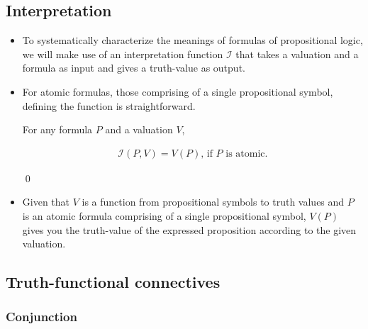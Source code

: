 \documentclass[11pt]{article}
\begin{document}
\subsection{Interpretation}

\begin{itemize}

\item To systematically characterize the meanings of formulas of propositional
logic, we will make use of an interpretation function $\mathcal{I}$ that takes a valuation and
a formula as input and gives a truth-value as output.

\item For atomic formulas, those comprising of a single propositional symbol,
defining the function is straightforward. 


\begin{udefinition}\label{isimple}

For any formula $P$ and a
valuation $V$,

\begin{align*}
\mathcal{I}(P,V) = V(P)\text{, if } P \text{ is atomic}. 
\end{align*}

\qed
\end{udefinition}

\item Given that $V$ is a function from propositional symbols to truth values
and $P$ is an atomic formula comprising of a single propositional symbol, $V(P)$
gives you the truth-value of the expressed proposition according to the given
valuation.

\end{itemize}

\subsection{Truth-functional connectives}

\subsubsection{Conjunction}
\end{document}
